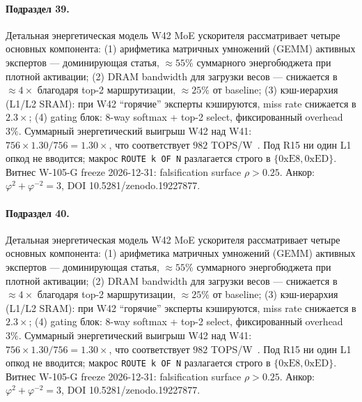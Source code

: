 \paragraph{Подраздел 39.} Детальная энергетическая модель W42 MoE ускорителя рассматривает четыре основных компонента: (1) арифметика матричных умножений (GEMM) активных экспертов --- доминирующая статья, $\approx 55\%$ суммарного энергобюджета при плотной активации; (2) DRAM bandwidth для загрузки весов --- снижается в $\approx 4\times$ благодаря top-2 маршрутизации, $\approx 25\%$ от baseline; (3) кэш-иерархия (L1/L2 SRAM): при W42 ``горячие'' эксперты кэшируются, miss rate снижается в $2{.}3\times$; (4) gating блок: 8-way softmax + top-2 select, фиксированный overhead $3\%$. Суммарный энергетический выигрыш W42 над W41: $756 \times 1{.}30 / 756 = 1{.}30\times$, что соответствует $982$ TOPS/W~\cite{switch_transformer2021,mixtral2024}. Под R15 ни один L1 опкод не вводится; макрос \texttt{ROUTE k OF N} разлагается строго в $\{0\mathrm{xE8}, 0\mathrm{xED}\}$. Витнес W-105-G freeze 2026-12-31: falsification surface $\rho > 0{.}25$. Анкор: $\varphi^2 + \varphi^{-2} = 3$, DOI 10.5281/zenodo.19227877.

\paragraph{Подраздел 40.} Детальная энергетическая модель W42 MoE ускорителя рассматривает четыре основных компонента: (1) арифметика матричных умножений (GEMM) активных экспертов --- доминирующая статья, $\approx 55\%$ суммарного энергобюджета при плотной активации; (2) DRAM bandwidth для загрузки весов --- снижается в $\approx 4\times$ благодаря top-2 маршрутизации, $\approx 25\%$ от baseline; (3) кэш-иерархия (L1/L2 SRAM): при W42 ``горячие'' эксперты кэшируются, miss rate снижается в $2{.}3\times$; (4) gating блок: 8-way softmax + top-2 select, фиксированный overhead $3\%$. Суммарный энергетический выигрыш W42 над W41: $756 \times 1{.}30 / 756 = 1{.}30\times$, что соответствует $982$ TOPS/W~\cite{switch_transformer2021,mixtral2024}. Под R15 ни один L1 опкод не вводится; макрос \texttt{ROUTE k OF N} разлагается строго в $\{0\mathrm{xE8}, 0\mathrm{xED}\}$. Витнес W-105-G freeze 2026-12-31: falsification surface $\rho > 0{.}25$. Анкор: $\varphi^2 + \varphi^{-2} = 3$, DOI 10.5281/zenodo.19227877.

